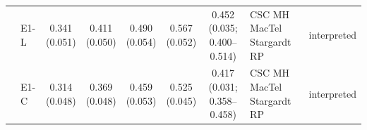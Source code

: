 \begin{longtable}{@{}p{3.2cm}lcccccp{2.4cm}p{2.2cm}@{}}
 & E1-L & \makecell{0.341\\{\scriptsize (0.051)}} & \makecell{0.411\\{\scriptsize (0.050)}} & \makecell{0.490\\{\scriptsize (0.054)}} & \makecell{0.567\\{\scriptsize (0.052)}} & \makecell{0.452\\{\scriptsize (0.035; 0.400--0.514)}} & CSC MH MacTel Stargardt RP & interpreted \\
 & E1-C & \makecell{0.314\\{\scriptsize (0.048)}} & \makecell{0.369\\{\scriptsize (0.048)}} & \makecell{0.459\\{\scriptsize (0.053)}} & \makecell{0.525\\{\scriptsize (0.045)}} & \makecell{0.417\\{\scriptsize (0.031; 0.358--0.458)}} & CSC MH MacTel Stargardt RP & interpreted \\
\end{longtable}
